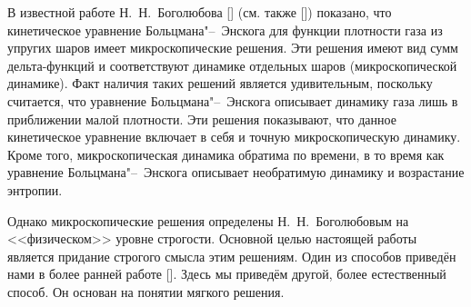 



\date{19/XI/2012} %



\maketitle

В известной работе Н.~Н.~Боголюбова [] (см. также []) показано, что кинетическое уравнение Больцмана"--~Энскога для функции плотности газа из упругих шаров имеет микроскопические решения. 
Эти решения имеют вид сумм дельта-функций и соответствуют динамике отдельных шаров (микроскопической динамике). Факт наличия таких решений является удивительным, поскольку считается, что уравнение Больцмана"--~Энскога описывает динамику газа лишь в приближении малой плотности. 
Эти решения показывают, что данное кинетическое уравнение включает в себя и точную микроскопическую динамику. Кроме того, микроскопическая динамика обратима по времени, в то время как  уравнение Больцмана"--~Энскога описывает необратимую динамику и возрастание энтропии.

Однако микроскопические решения определены Н.~Н.~Боголюбовым на
<<физическом>> уровне строгости. Основной целью настоящей работы
является придание строгого смысла этим решениям. Один из способов
приведён нами в более ранней работе []. Здесь мы
приведём другой, более естественный способ. Он основан на понятии
мягкого решения.

